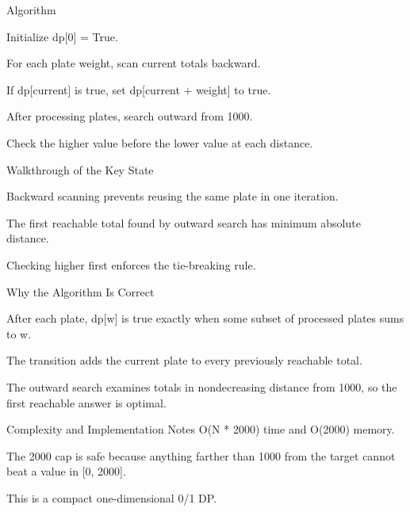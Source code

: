 \documentclass[aspectratio=169,11pt]{beamer}
\begin{document}
\begin{frame}{Algorithm}
\begin{tightitemize}
  \item Initialize dp[0] = True.
  \item For each plate weight, scan current totals backward.
  \item If dp[current] is true, set dp[current + weight] to true.
  \item After processing plates, search outward from 1000.
  \item Check the higher value before the lower value at each distance.
\end{tightitemize}
\end{frame}

\begin{frame}{Walkthrough of the Key State}
\begin{tightitemize}
  \item Backward scanning prevents reusing the same plate in one iteration.
  \item The first reachable total found by outward search has minimum absolute distance.
  \item Checking higher first enforces the tie-breaking rule.
\end{tightitemize}
\end{frame}

\begin{frame}{Why the Algorithm Is Correct}
\begin{tightitemize}
  \item After each plate, dp[w] is true exactly when some subset of processed plates sums to w.
  \item The transition adds the current plate to every previously reachable total.
  \item The outward search examines totals in nondecreasing distance from 1000, so the first reachable answer is optimal.
\end{tightitemize}
\end{frame}

\begin{frame}{Complexity and Implementation Notes}
\small
{} O(N * 2000) time and O(2000) memory.

\vspace{0.3cm}
\begin{tightitemize}
  \item The 2000 cap is safe because anything farther than 1000 from the target cannot beat a value in [0, 2000].
  \item This is a compact one-dimensional 0/1 DP.
\end{tightitemize}
\end{frame}
\end{document}
